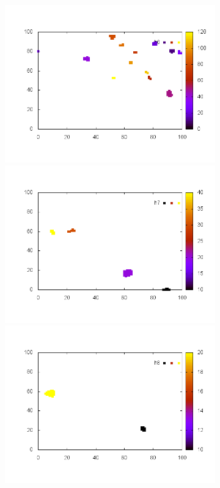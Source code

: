\documentclass[10pt,a4paper]{article}
\begin{document}
\begin{figure}
\begin{subfigure}[b]{1\textwidth}
\includegraphics[scale=.3]{./img/SCC_Stable3/cut95p/6.png}
\includegraphics[scale=.3]{./img/SCC_Stable3/cut95p/7.png}
\includegraphics[scale=.3]{./img/SCC_Stable3/cut95p/8.png}

\end{subfigure}
\end{figure}
\end{document}
